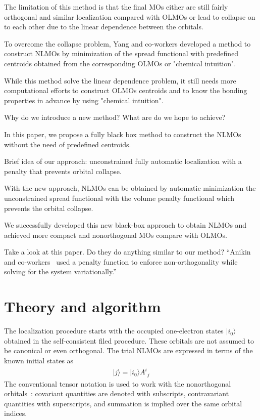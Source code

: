 \documentclass[aps,prl,reprint,amsmath,amssymb]{revtex4-1}
\newcommand{\ket}[1]{\ensuremath{\vert #1 \rangle}}
\begin{document}
The limitation of this method is that the final MOs either are still fairly orthogonal and similar localization compared with OLMOs or lead to collapse on to each other due to the linear dependence between the orbitals.

To overcome the collapse problem, Yang and co-workers  developed a method to construct NLMOs by minimization of the spread functional with predefined centroids obtained from the corresponding OLMOs or "chemical intuition".

While this method solve the linear dependence problem, it still needs more computational efforts to construct OLMOs centroids and to know the bonding properties in advance by using "chemical intuition".

Why do we introduce a new method? What are do we hope to achieve?

In this paper, we propose a fully black box method to construct the NLMOs without the need of predefined centroids.

Brief idea of our approach: unconstrained fully automatic localization with a penalty that prevents orbital collapse.

With the new approach, NLMOs can be obtained by automatic minimization the unconstrained spread functional with the volume penalty functional which prevents the orbital collapse.

We successfully developed this new black-box approach to obtain NLMOs and achieved more compact and nonorthogonal MOs compare with OLMOs.

Take a look at this paper. 
Do they do anything similar to our method? 
``Anikin and co-workers~\cite{anikin2004} used a penalty function to enforce non-orthogonality while solving for the system variationally.''


\section{Theory and algorithm}

The localization procedure starts with the occupied one-electron states $\ket{i_0}$ obtained in the self-consistent filed procedure. These orbitals are not assumed to be canonical or even orthogonal. The trial NLMOs are expressed in terms of the known initial states as
%
\begin{equation}
\begin{split}
\ket{j} = \ket{i_0} {A^i}_j  
\end{split}
\end{equation}
%
The conventional tensor notation is used to work with the nonorthogonal orbitals~\cite{head1998tensor}: covariant quantities are denoted with subscripts, contravariant quantities with superscripts, and summation is implied over the same orbital indices.
\end{document}
